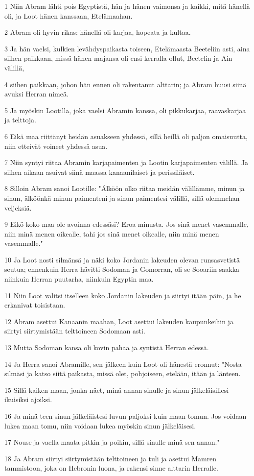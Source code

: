 \par 1 Niin Abram lähti pois Egyptistä, hän ja hänen vaimonsa ja kaikki, mitä hänellä oli, ja Loot hänen kanssaan, Etelämaahan.
\par 2 Abram oli hyvin rikas: hänellä oli karjaa, hopeata ja kultaa.
\par 3 Ja hän vaelsi, kulkien levähdyspaikasta toiseen, Etelämaasta Beeteliin asti, aina siihen paikkaan, missä hänen majansa oli ensi kerralla ollut, Beetelin ja Ain välillä,
\par 4 siihen paikkaan, johon hän ennen oli rakentanut alttarin; ja Abram huusi siinä avuksi Herran nimeä.
\par 5 Ja myöskin Lootilla, joka vaelsi Abramin kanssa, oli pikkukarjaa, raavaskarjaa ja telttoja.
\par 6 Eikä maa riittänyt heidän asuakseen yhdessä, sillä heillä oli paljon omaisuutta, niin etteivät voineet yhdessä asua.
\par 7 Niin syntyi riitaa Abramin karjapaimenten ja Lootin karjapaimenten välillä. Ja siihen aikaan asuivat siinä maassa kanaanilaiset ja perissiläiset.
\par 8 Silloin Abram sanoi Lootille: "Älköön olko riitaa meidän välillämme, minun ja sinun, älköönkä minun paimenteni ja sinun paimentesi välillä, sillä olemmehan veljeksiä.
\par 9 Eikö koko maa ole avoinna edessäsi? Eroa minusta. Jos sinä menet vasemmalle, niin minä menen oikealle, tahi jos sinä menet oikealle, niin minä menen vasemmalle."
\par 10 Ja Loot nosti silmänsä ja näki koko Jordanin lakeuden olevan runsasvetistä seutua; ennenkuin Herra hävitti Sodoman ja Gomorran, oli se Sooariin saakka niinkuin Herran puutarha, niinkuin Egyptin maa.
\par 11 Niin Loot valitsi itselleen koko Jordanin lakeuden ja siirtyi itään päin, ja he erkanivat toisistaan.
\par 12 Abram asettui Kanaanin maahan, Loot asettui lakeuden kaupunkeihin ja siirtyi siirtymistään telttoineen Sodomaan asti.
\par 13 Mutta Sodoman kansa oli kovin pahaa ja syntistä Herran edessä.
\par 14 Ja Herra sanoi Abramille, sen jälkeen kuin Loot oli hänestä eronnut: "Nosta silmäsi ja katso siitä paikasta, missä olet, pohjoiseen, etelään, itään ja länteen.
\par 15 Sillä kaiken maan, jonka näet, minä annan sinulle ja sinun jälkeläisillesi ikuisiksi ajoiksi.
\par 16 Ja minä teen sinun jälkeläistesi luvun paljoksi kuin maan tomun. Jos voidaan lukea maan tomu, niin voidaan lukea myöskin sinun jälkeläisesi.
\par 17 Nouse ja vaella maata pitkin ja poikin, sillä sinulle minä sen annan."
\par 18 Ja Abram siirtyi siirtymistään telttoineen ja tuli ja asettui Mamren tammistoon, joka on Hebronin luona, ja rakensi sinne alttarin Herralle.

